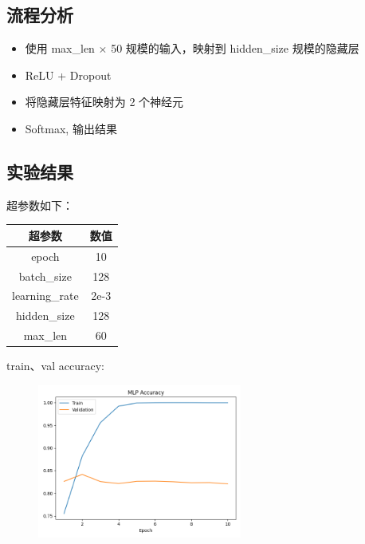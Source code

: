 \documentclass{article}
\begin{document}
\subsection{流程分析}

\begin{itemize}
    \item 使用 max\_len $\times $ 50 规模的输入，映射到 hidden\_size 规模的隐藏层
    \item ReLU + Dropout
    \item 将隐藏层特征映射为 2 个神经元
    \item Softmax, 输出结果
\end{itemize}

\subsection{实验结果}

超参数如下：

\begin{table}[H]  
    \centering        
    \begin{tabular}{|c|c|}
    \hline
    {\bf 超参数} & {\bf 数值} \\
    \hline
    epoch & 10  \\
    \hline
    batch\_size & 128  \\
    \hline
    learning\_rate & 2e-3  \\
    \hline
    hidden\_size & 128 \\
    \hline
    max\_len & 60 \\
    \hline
    \end{tabular}
\end{table}

train、val accuracy:
\begin{figure}[h]
    \centering
    \includegraphics[width=0.6\textwidth]{../results/mlp_acc.png}
\end{figure}
\end{document}
